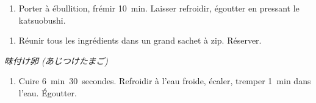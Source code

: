 \label{chashu}



\begin{ingredients}
\end{ingredients}

\begin{recipe}
  \begin{enumerate}

  \item Porter à ébullition, frémir 10~min. Laisser refroidir,
    égoutter en pressant le katsuobushi.

  \end{enumerate}
\end{recipe}



\begin{ingredients}
\end{ingredients}

\begin{recipe}
  \begin{enumerate}

  \item Réunir tous les ingrédients dans un grand sachet à zip.
    Réserver.

  \end{enumerate}
\end{recipe}



\textit{味付け卵 (あじつけたまご)}

\begin{ingredients}
\end{ingredients}

\begin{recipe}
  \begin{enumerate}

  \item Cuire 6~min~30~secondes. Refroidir à l'eau froide, écaler, tremper
    1~min dans l'eau. Égoutter.

  \end{enumerate}
\end{recipe}


